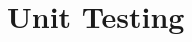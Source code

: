 \documentclass[12pt, titlepage]{article}
\begin{document}
		

	

\section{Unit Testing}
\end{document}
